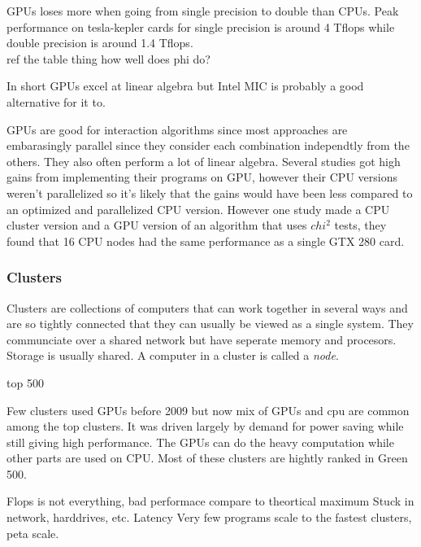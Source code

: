 \documentclass[10pt,a4paper]{article}
\begin{document}
GPUs loses more when going from single precision to double than CPUs. Peak performance on tesla-kepler cards for single precision is around 4 Tflops while double precision is around 1.4 Tflops. \cite{nvtesla}\\ ref the table thing how well does phi do?

In short GPUs excel at linear algebra but Intel MIC is probably a good alternative for it to.

GPUs are good for interaction algorithms since most approaches are embarasingly parallel since they consider each combination independtly from the others. They also often perform a lot of linear algebra. Several studies got high gains from implementing their programs on GPU, however their CPU versions weren't parallelized so it's likely that the gains would have been less compared to an optimized and parallelized CPU version.\cite{gwis,gboost,gmdr_gpu,cuda_lr,genie_2012,plink_gpu} However one study made a CPU cluster version and a GPU version of an algorithm that uses $chi^2$ tests, they found that 16 CPU nodes had the same performance as a single GTX 280 card\cite{jiang_accelerating}.%

\subsubsection{Clusters}
Clusters are collections of computers that can work together in several ways and are so tightly connected that they can usually be viewed as a single system. They communciate over a shared network but have seperate memory and procesors. Storage is usually shared. A computer in a cluster is called a \emph{node}. \cite{intro_hpc, kirk2012programming}

top 500\cite{TOP500}

Few clusters used GPUs before 2009 but now mix of GPUs and cpu are common among the top clusters. It was driven largely by demand for power saving while still giving high performance. The GPUs can do the heavy computation while other parts are used on CPU. Most of these clusters are hightly ranked in Green 500. \cite{kirk2012programming}

Flops is not everything, bad performace compare to theortical maximum
Stuck in network, harddrives, etc. Latency
Very few programs scale to the fastest clusters, peta scale.
\end{document}
